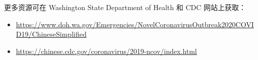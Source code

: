\documentclass[10pt]{article}
\begin{document}
更多资源可在 Washington State Department of Health 和 CDC 网站上获取：

\begin{itemize}
\item

  \url{https://www.doh.wa.gov/Emergencies/NovelCoronavirusOutbreak2020COVID19/ChineseSimplified}

\item

  \url{https://chinese.cdc.gov/coronavirus/2019-ncov/index.html}

\end{itemize}
\end{document}
